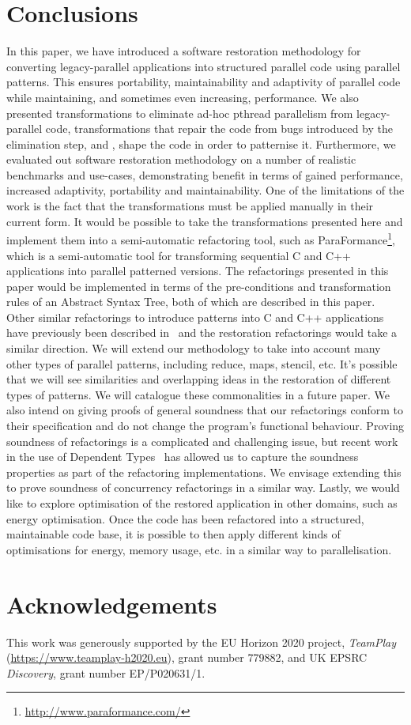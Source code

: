 \section{Conclusions} \label{sec:Conclusions} 
In this paper, we have introduced a software restoration methodology for converting legacy-parallel applications into structured parallel code using parallel patterns. This ensures portability, maintainability and adaptivity of parallel code while maintaining, and sometimes even increasing, performance. We also presented transformations to eliminate ad-hoc pthread parallelism from legacy-parallel code, transformations that repair the code from bugs introduced by the elimination step, and , shape the code in order to patternise it. Furthermore, we evaluated out software restoration methodology on a number of realistic benchmarks and use-cases, demonstrating benefit in terms of gained performance, increased adaptivity, portability and maintainability.
%
One of the limitations of the work is the fact that the transformations must be applied manually in their current form. It would be possible to take the transformations presented here and implement them into a semi-automatic refactoring tool, such as ParaFormance\footnote{\url{http://www.paraformance.com/}}, which is a semi-automatic tool for transforming sequential C and C++ applications into parallel patterned versions. The refactorings presented in this paper would be implemented in terms of the pre-conditions and transformation rules of an Abstract Syntax Tree, both of which are described in this paper. Other similar refactorings to introduce patterns into C and C++ applications have previously been described in~\cite{hlpp,grppirefac,brownagricultural,DBLP:conf/pdp/JanjicBMHDAG16} and the restoration refactorings would take a similar direction. 
%
We will extend our methodology to take into account many other types of parallel patterns, including reduce, maps, stencil, etc. It's possible that we will see similarities and overlapping ideas in the restoration of different types of patterns. We will catalogue these commonalities in a future paper. 
%
We also intend on giving proofs of general soundness that our refactorings conform to their specification and do not change the program's functional behaviour. Proving soundness of refactorings is a complicated and challenging issue, but recent work in the use of Dependent Types~\cite{soundrefac} has allowed us to capture the soundness properties as part of the refactoring implementations. We envisage extending this to prove soundness of concurrency refactorings in a similar way. 
%
Lastly, we would like to explore optimisation of the restored application in other domains, such as energy optimisation. Once the code has been refactored into a structured, maintainable code base, it is possible to then apply different kinds of optimisations for energy, memory usage, etc. in a similar way to parallelisation. 


\section*{Acknowledgements}
This work was generously supported by the EU Horizon 2020 project, \emph{TeamPlay} (\url{https://www.teamplay-h2020.eu}), grant number 779882, and UK EPSRC \emph{Discovery}, grant number EP/P020631/1.


